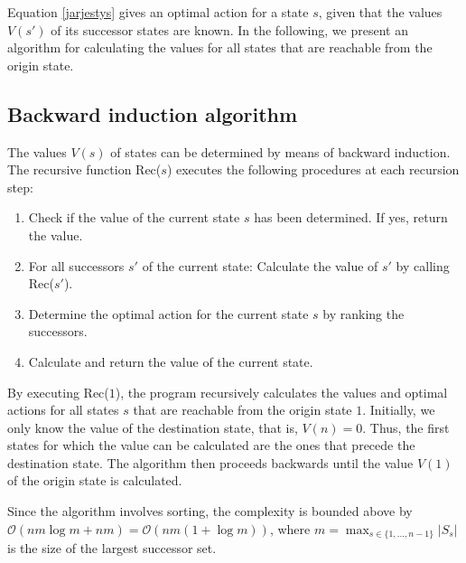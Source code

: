 \documentclass[dissertation,draft*]{aaltoseries}
\begin{document}
Equation \eqref{jarjestys} 
gives an optimal action for a state $s$, given that the values $V(s')$ of its successor states are known.
In the following, we present an algorithm for calculating the values for all states that are reachable from the origin state.

\subsection{Backward induction algorithm}
\label{alg01}
The values $V(s)$ of states can be determined
by means of backward induction. The recursive function Rec($s$) executes the following procedures at each recursion step:
\begin{enumerate}
 \item 
Check if the value of the current state $s$ has been determined. If yes, return the value.
\item
For all successors $s'$ of the current state: Calculate the value of $s'$ by calling Rec($s'$).
\item
Determine the optimal action for the current state $s$ by ranking the successors.
\item
Calculate and return the value of the current state.
\end{enumerate}
By executing Rec($1$), the program recursively calculates the values and optimal actions for 
all states $s$ that are reachable from the origin state $1$.
Initially, we only know the value of the destination state, that is, $V(n)=0$.
Thus, the first states for which the value can be calculated
are the ones that precede the destination state. 
The algorithm then proceeds backwards until the value $V(1)$ of the origin state is calculated.

Since the algorithm involves sorting, the complexity is bounded above by $\mathcal{O}(n m \log m + nm) = \mathcal{O}(n m (1+\log m))$,
where $m = \max_{s \in \{1,\ldots,n-1\}}|S_s|$ is the size of the largest successor set. 
\end{document}
